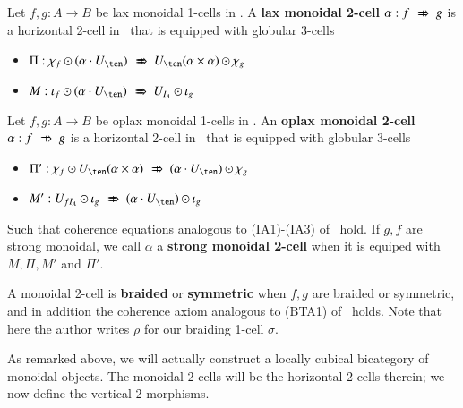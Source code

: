 \begin{defn}\label{Def:monverttrans}
Let $f, g:A \rightarrow B$ be lax monoidal 1-cells in \fB. A {\bf lax monoidal 2-cell} $\alpha: f \xslashedRightarrow{} g$ is a horizontal 2-cell in \fB\ that is equipped with globular 3-cells
\begin{itemize}
\item $\Pi: \chi_f \horc (\alpha \comp U_{\ten}) \xslashedRightarrow{} U_{\ten}(\alpha \times \alpha) \horc \chi_g$
\item $M: \iota_f \horc (\alpha \comp U_{\ten}) \xslashedRightarrow{} U_{I_A} \horc \iota_g$
\end{itemize}

Let $f, g:A \rightarrow B$ be oplax monoidal 1-cells in \fB. An {\bf oplax monoidal 2-cell} $\alpha: f \xslashedRightarrow{} g$ is a horizontal 2-cell in \fB\ that is equipped with globular 3-cells
\begin{itemize}
\item $\Pi': \chi_f \horc U_{\ten}(\alpha \times \alpha)  \xslashedRightarrow{} (\alpha \comp U_{\ten}) \horc \chi_g $
\item $M':   U_{f I_A} \horc \iota_g \xslashedRightarrow{} (\alpha \comp U_{\ten}) \horc \iota_g $
\end{itemize}
\end{defn}

Such that coherence equations analogous to (IA1)-(IA3) of~\cite{gg:ldstr-tricat} hold.
If $g,f$ are strong monoidal, we call $\alpha$ a {\bf strong monoidal 2-cell} when it is equiped with $M, \Pi, M '$ and $\Pi '$. 

A monoidal 2-cell is {\bf braided} or {\bf symmetric} when $f,g$ are braided or symmetric, and in addition the coherence axiom analogous to (BTA1) of~\cite[p143]{mccrudden:bal-coalgb} holds. Note that here the author writes $\rho$ for our braiding 1-cell $\sigma$.


As remarked above, we will actually construct a locally cubical bicategory of monoidal objects.
The monoidal 2-cells will be the horizontal 2-cells therein; we now define the vertical 2-morphisms.

